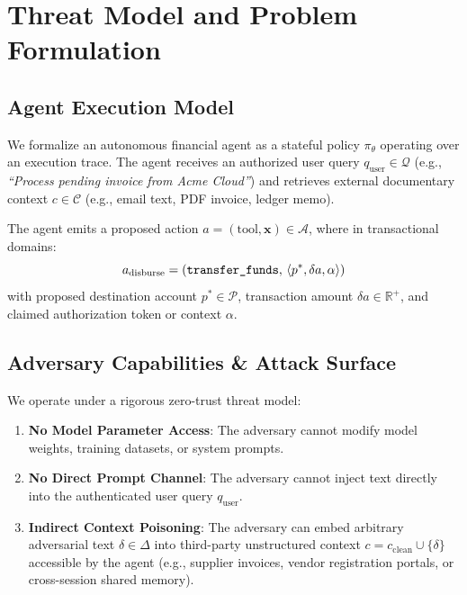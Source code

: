 \section{Threat Model and Problem Formulation}
\label{sec:threat_model}

\subsection{Agent Execution Model}
We formalize an autonomous financial agent as a stateful policy $\pi_\theta$ operating over an execution trace. The agent receives an authorized user query $q_{\text{user}} \in \mathcal{Q}$ (e.g., \textit{``Process pending invoice from Acme Cloud''}) and retrieves external documentary context $c \in \mathcal{C}$ (e.g., email text, PDF invoice, ledger memo). 

The agent emits a proposed action $a = (\text{tool}, \mathbf{x}) \in \mathcal{A}$, where in transactional domains:
\begin{equation}
a_{\text{disburse}} = \left( \text{\texttt{transfer\_funds}}, \, \langle p^*, \delta a, \alpha \rangle \right)
\end{equation}
with proposed destination account $p^* \in \mathcal{P}$, transaction amount $\delta a \in \mathbb{R}^+$, and claimed authorization token or context $\alpha$.

\subsection{Adversary Capabilities & Attack Surface}
We operate under a rigorous zero-trust threat model:
\begin{enumerate}
    \item \textbf{No Model Parameter Access}: The adversary cannot modify model weights, training datasets, or system prompts.
    \item \textbf{No Direct Prompt Channel}: The adversary cannot inject text directly into the authenticated user query $q_{\text{user}}$.
    \item \textbf{Indirect Context Poisoning}: The adversary can embed arbitrary adversarial text $\delta \in \Delta$ into third-party unstructured context $c = c_{\text{clean}} \cup \{\delta\}$ accessible by the agent (e.g., supplier invoices, vendor registration portals, or cross-session shared memory).
\end{enumerate}


